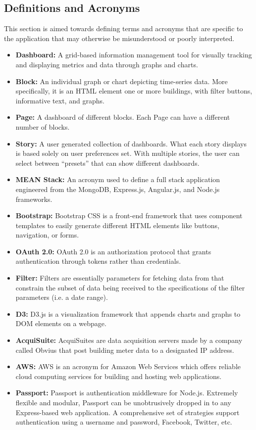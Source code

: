 \documentclass[journal,10pt,onecolumn,compsoc]{IEEEtran}
\begin{document}
    \subsection{Definitions and Acronyms}
    This section is aimed towards defining terms and acronyms that are specific to the application that may otherwise be misunderstood or poorly interpreted.
    \begin{itemize}
        \item \textbf{Dashboard:}
            A grid-based information management tool for visually tracking and displaying metrics and data through graphs and charts.
        \item \textbf{Block:} 
            An individual graph or chart depicting time-series data. More specifically, it is an HTML element one or more buildings, with filter buttons, informative text, and graphs.
        \item \textbf{Page:} 
            A dashboard of different blocks. Each Page can have a different number of blocks.
        \item \textbf{Story:} 
            A user generated collection of dashboards. What each story displays is based solely on user preferences set. With multiple stories, the user can select between ``presets'' that can show different dashboards.
        \item \textbf{MEAN Stack:} 
            An acronym used to define a full stack application engineered from the MongoDB, Express.js, Angular.js, and Node.js frameworks. 
        \item \textbf{Bootstrap:} 
            Bootstrap CSS is a front-end framework that uses component templates to easily generate different HTML elements like buttons, navigation, or forms. 
        \item \textbf{OAuth 2.0:} 
            OAuth 2.0 is an authorization protocol that grants authentication through tokens rather than credentials. 
        \item \textbf{Filter:} 
            Filters are essentially parameters for fetching data from that constrain the subset of data being received to the specifications of the filter parameters (i.e. a date range). 
        \item \textbf{D3:} 
            D3.js is a visualization framework that appends charts and graphs to DOM elements on a webpage. 
        \item \textbf{AcquiSuite:} 
            AcquiSuites are data acquisition servers made by a company called Obvius that post building meter data to a designated IP address.
        \item \textbf{AWS:} 
            AWS is an acronym for Amazon Web Services which offers reliable cloud computing services for building and hosting web applications.
	   \item \textbf{Passport:} 
			Passport is authentication middleware for Node.js. Extremely flexible and modular, Passport can be unobtrusively dropped in to any Express-based web application. A comprehensive set of strategies support authentication using a username and password, Facebook, Twitter, etc.
   \end{itemize}
\end{document}
